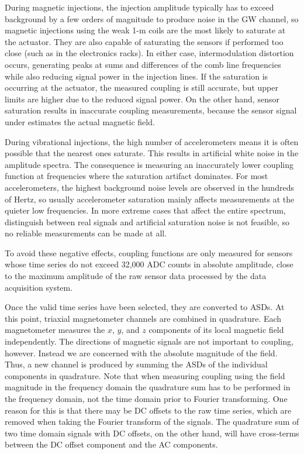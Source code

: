 During magnetic injections, the injection amplitude typically has to exceed background by a few orders of magnitude to produce noise in the \ac{GW} channel, so magnetic injections using the weak 1-m coils are the most likely to saturate at the actuator.
They are also capable of saturating the sensors if performed too close (such as in the electronics racks).
In either case, intermodulation distortion occurs, generating peaks at sums and differences of the comb line frequencies while also reducing signal power in the injection lines.
If the saturation is occurring at the actuator, the measured coupling is still accurate, but upper limits are higher due to the reduced signal power.
On the other hand, sensor saturation results in inaccurate coupling measurements, because the sensor signal under estimates the actual magnetic field.

During vibrational injections, the high number of accelerometers means it is often possible that the nearest ones saturate.
This results in artificial white noise in the amplitude spectra.
The consequence is measuring an inaccurately lower coupling function at frequencies where the saturation artifact dominates.
For most accelerometers, the highest background noise levels are observed in the hundreds of Hertz, so usually accelerometer saturation mainly affects measurements at the quieter low frequencies.
In more extreme cases that affect the entire spectrum, distinguish between real signals and artificial saturation noise is not feasible, so no reliable measurements can be made at all.

To avoid these negative effects, coupling functions are only measured for sensors whose time series do not exceed 32,000 \ac{ADC} counts in absolute amplitude, close to the maximum amplitude of the raw sensor data processed by the data acquisition system.

Once the valid time series have been selected, they are converted to \acp{ASD}.
At this point, triaxial magnetometer channels are combined in quadrature.
Each magnetometer measures the $x$, $y$, and $z$ components of its local magnetic field independently.
The directions of magnetic signals are not important to coupling, however.
Instead we are concerned with the absolute magnitude of the field.
Thus, a new channel is produced by summing the ASDs of the individual components in quadrature.
Note that when measuring coupling using the field magnitude in the frequency domain the quadrature sum has to be performed in the frequency domain, not the time domain prior to Fourier transforming.
One reason for this is that there may be DC offsets to the raw time series, which are removed when taking the Fourier transform of the signals.
The quadrature sum of two time domain signals with DC offsets, on the other hand, will have cross-terms between the DC offset component and the AC components.

